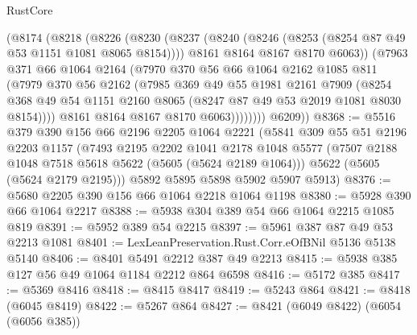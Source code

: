 \begin{lexlean}{RustCore}
\begin{coremodule}
              (@8174
                (@8218
                  (@8226
                    (@8230
                      (@8237
                        (@8240 (@8246 (@8253 (@8254 @87 @49 @53 @1151 @1081 @8065 @8154))))
                        @8161
                        @8164
                        @8167
                        @8170
                        @6063))
                    (@7963
                      @371
                      @66
                      @1064
                      @2164
                      (@7970
                        @370
                        @56
                        @66
                        @1064
                        @2162
                        @1085
                        @811
                        (@7979
                          @370
                          @56
                          @2162
                          (@7985
                            @369
                            @49
                            @55
                            @1981
                            @2161
                            @7909
                            (@8254
                              @368
                              @49
                              @54
                              @1151
                              @2160
                              @8065
                              (@8247 @87 @49 @53 @2019 @1081 @8030 @8154))))
                        @8161
                        @8164
                        @8167
                        @8170
                        @6063))))))))
        @6209))
@8368 := @5516
    @379
    @390
    @156
    @66
    @2196
    @2205
    @1064
    @2221
    (@5841
      @309
      @55
      @51
      @2196
      @2203
      @1157
      (@7493
        @2195
        @2202
        @1041
        @2178
        @1048
        @5577
        (@7507 @2188 @1048 @7518 @5618 @5622 (@5605 (@5624 @2189 @1064)))
        @5622
        (@5605 (@5624 @2179 @2195)))
      @5892
      @5895
      @5898
      @5902
      @5907
      @5913)
@8376 := @5680 @2205 @390 @156 @66 @1064 @2218 @1064 @1198
@8380 := @5928 @390 @66 @1064 @2217
@8388 := @5938 @304 @389 @54 @66 @1064 @2215 @1085 @819
@8391 := @5952 @389 @54 @2215
@8397 := @5961 @387 @87 @49 @53 @2213 @1081
@8401 := LexLeanPreservation.Rust.Corr.eOfBNil @5136 @5138 @5140
@8406 := @8401 @5491 @2212 @387 @49 @2213
@8415 := @5938 @385 @127 @56 @49 @1064 @1184 @2212 @864 @6598
@8416 := @5172 @385
@8417 := @5369 @8416
@8418 := @8415 @8417
@8419 := @5243 @864
@8421 := @8418 (@6045 @8419)
@8422 := @5267 @864
@8427 := @8421 (@6049 @8422) (@6054 (@6056 @385))

\end{coremodule}
\end{lexlean}
